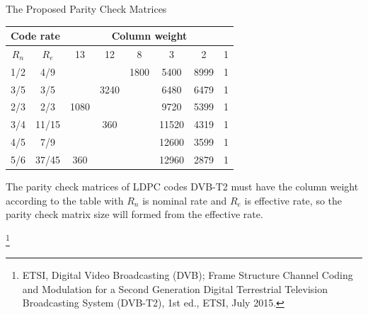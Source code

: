 \documentclass[11pt, aspectratio=169]{beamer}
\newcommand\blfootnote[1]{%
  \begingroup
  \renewcommand\thefootnote{}\footnote{#1}%
  \addtocounter{footnote}{-1}%
  \endgroup
}
\begin{document}
\begin{frame}{The Proposed Parity Check Matrices }
\vspace{-0.5cm}
\begin{table}
\renewcommand{\figurename}{Table}
	\centering 
				\label{table:dvb-t2lite}
	\begin{tabular}{|c|c|c|c|c|c|c|c|}
		\hline
		\multicolumn{2}{|c|}{Code rate} & \multicolumn{6}{c|}{Column weight}    \\ \hline
		$R_n$  & $R_e$  & 13   & 12   & 8    & 3     & 2    & 1 \\ \hline
		1/2           & 4/9             &      &      & 1800 & 5400  & 8999 & 1 \\ \hline
		3/5           & 3/5             &      & 3240 &      & 6480  & 6479 & 1 \\ \hline
		2/3           & 2/3             & 1080 &      &      & 9720  & 5399 & 1 \\ \hline
		3/4           & 11/15           &      & 360  &      & 11520 & 4319 & 1 \\ \hline
		4/5           & 7/9             &      &      &      & 12600 & 3599 & 1 \\ \hline
		5/6           & 37/45           & 360  &      &      & 12960 & 2879 & 1 \\ \hline
	\end{tabular}


\end{table}


The parity check matrices of LDPC codes DVB-T2 must have the column weight according to the table with $R_n$ is nominal rate and $R_e$ is effective rate, so the parity check matrix size will formed from the effective rate.

\blfootnote{\tiny{ETSI, Digital Video Broadcasting (DVB); Frame Structure Channel Coding and Modulation for a Second Generation Digital Terrestrial Television Broadcasting System (DVB-T2), 1st ed., ETSI, July 2015.}}
\end{frame}
\end{document}
